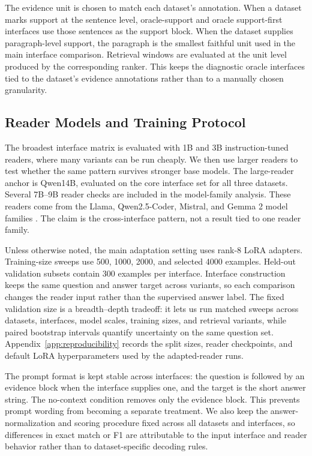 \documentclass[a4paper,fleqn]{cas-sc}
\begin{document}
The evidence unit is chosen to match each dataset's annotation. When a dataset
marks support at the sentence level, oracle-support and oracle support-first
interfaces use those sentences as the support block. When the dataset supplies
paragraph-level support, the paragraph is the smallest faithful unit used in
the main interface comparison. Retrieval windows are evaluated at the unit
level produced by the corresponding ranker. This keeps the diagnostic oracle
interfaces tied to the dataset's evidence annotations rather than to a manually
chosen granularity.

\subsection{Reader Models and Training Protocol}

The broadest interface matrix is evaluated with 1B and 3B instruction-tuned
readers, where many variants can be run cheaply. We then use larger readers to
test whether the same pattern survives stronger base models. The large-reader
anchor is Qwen14B, evaluated on the core interface set for all three datasets.
Several 7B--9B reader checks are included in the model-family analysis. These
readers come from the Llama, Qwen2.5-Coder, Mistral, and Gemma 2 model families
\citep{grattafiori2024llama3,hui2024qwen25coder,jiang2023mistral,riviere2024gemma2}.
The claim is the cross-interface pattern, not a result tied to one reader
family.

Unless otherwise noted, the main adaptation setting uses rank-8 LoRA adapters.
Training-size sweeps use 500, 1000, 2000, and selected 4000 examples. Held-out
validation subsets contain 300 examples per interface. Interface construction
keeps the same question and answer target across variants, so each comparison
changes the reader input rather than the supervised answer label.
The fixed validation size is a breadth--depth tradeoff: it lets us run matched
sweeps across datasets, interfaces, model scales, training sizes, and retrieval
variants, while paired bootstrap intervals quantify uncertainty on the same
question set.
Appendix~\ref{app:reproducibility} records the split sizes, reader checkpoints,
and default LoRA hyperparameters used by the adapted-reader runs.

The prompt format is kept stable across interfaces: the question is followed
by an evidence block when the interface supplies one, and the target is the
short answer string. The no-context condition removes only the evidence block.
This prevents prompt wording from becoming a separate treatment. We also keep
the answer-normalization and scoring procedure fixed across all datasets and
interfaces, so differences in exact match or F1 are attributable to the input
interface and reader behavior rather than to dataset-specific decoding rules.
\end{document}
